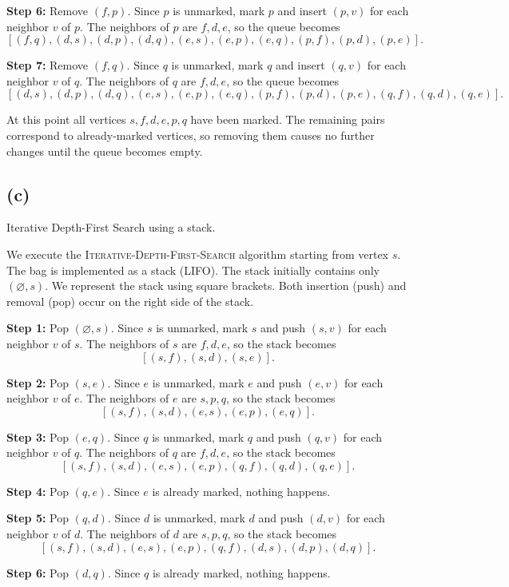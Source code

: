 \documentclass{brockcosc3p03}
\begin{document}
\textbf{Step 6:} Remove $(f,p)$. Since $p$ is unmarked, mark $p$ and insert
$(p,v)$ for each neighbor $v$ of $p$.
The neighbors of $p$ are $f,d,e$, so the queue becomes
\[
[(f,q),(d,s),(d,p),(d,q),(e,s),(e,p),(e,q),(p,f),(p,d),(p,e)].
\]

\textbf{Step 7:} Remove $(f,q)$. Since $q$ is unmarked, mark $q$ and insert
$(q,v)$ for each neighbor $v$ of $q$.
The neighbors of $q$ are $f,d,e$, so the queue becomes
\[
[(d,s),(d,p),(d,q),(e,s),(e,p),(e,q),(p,f),(p,d),(p,e),(q,f),(q,d),(q,e)].
\]

At this point all vertices $s,f,d,e,p,q$ have been marked. The remaining
pairs correspond to already-marked vertices, so removing them causes no
further changes until the queue becomes empty.

\subsection*{(c)}
Iterative Depth-First Search using a stack.

We execute the \textsc{Iterative-Depth-First-Search} algorithm starting from
vertex $s$. The bag is implemented as a stack (LIFO). The stack initially contains only $(\varnothing,s)$.
We represent the stack using square brackets. Both insertion (push) and removal (pop) occur on the right side of the stack.

\textbf{Step 1:} Pop $(\varnothing,s)$. Since $s$ is unmarked, mark $s$ and push
$(s,v)$ for each neighbor $v$ of $s$.
The neighbors of $s$ are $f,d,e$, so the stack becomes
\[
[(s,f),(s,d),(s,e)].
\]

\textbf{Step 2:} Pop $(s,e)$. Since $e$ is unmarked, mark $e$ and push
$(e,v)$ for each neighbor $v$ of $e$.
The neighbors of $e$ are $s,p,q$, so the stack becomes
\[
[(s,f),(s,d),(e,s),(e,p),(e,q)].
\]

\textbf{Step 3:} Pop $(e,q)$. Since $q$ is unmarked, mark $q$ and push
$(q,v)$ for each neighbor $v$ of $q$.
The neighbors of $q$ are $f,d,e$, so the stack becomes
\[
[(s,f),(s,d),(e,s),(e,p),(q,f),(q,d),(q,e)].
\]

\textbf{Step 4:} Pop $(q,e)$. Since $e$ is already marked, nothing happens.

\textbf{Step 5:} Pop $(q,d)$. Since $d$ is unmarked, mark $d$ and push
$(d,v)$ for each neighbor $v$ of $d$.
The neighbors of $d$ are $s,p,q$, so the stack becomes
\[
[(s,f),(s,d),(e,s),(e,p),(q,f),(d,s),(d,p),(d,q)].
\]

\textbf{Step 6:} Pop $(d,q)$. Since $q$ is already marked, nothing happens.
\end{document}
